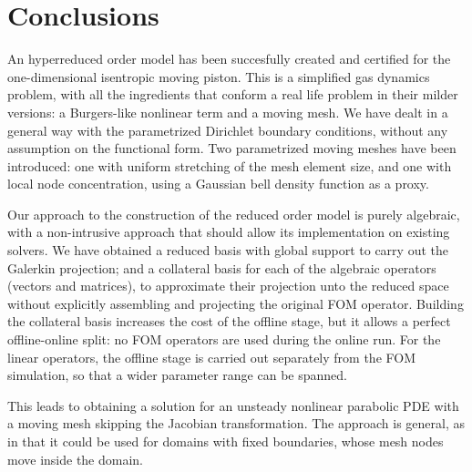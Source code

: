 \documentclass[thesis.tex]{subfiles}
\begin{document}
\section{Conclusions}
An hyperreduced order model has been succesfully created and certified for
the one-dimensional isentropic moving piston.
This is a simplified gas dynamics problem, 
with all the ingredients that conform a real life problem in their milder versions:
a Burgers-like nonlinear term and a moving mesh.
We have dealt in a general way with the parametrized Dirichlet boundary conditions,
without any assumption on the functional form.
Two parametrized moving meshes have been introduced: 
one with uniform stretching of the mesh element size,
and one with local node concentration, using a Gaussian bell density function as a proxy.

Our approach to the construction of the reduced order model is purely algebraic, 
with a non-intrusive approach that should allow its implementation on existing solvers.
We have obtained a reduced basis with global support to carry out the Galerkin projection;
and a collateral basis for each of the algebraic operators (vectors and matrices),
to approximate their projection unto the reduced space 
without explicitly assembling and projecting the original FOM operator.
Building the collateral basis increases the cost of the offline stage,
but it allows a perfect offline-online split:
no FOM operators are used during the online run. 
For the linear operators, the offline stage is carried out separately from the FOM simulation,
so that a wider parameter range can be spanned. 

This leads to obtaining a solution for an unsteady nonlinear parabolic PDE 
with a moving mesh skipping the Jacobian transformation.
The approach is general, as in that it could be used for domains with fixed boundaries, 
whose mesh nodes move inside the domain.
\end{document}
